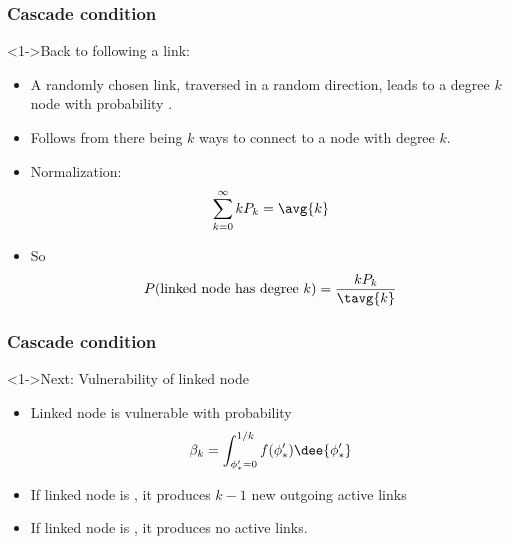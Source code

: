  \begin{frame}
    \frametitle{Cascade condition}

    \begin{block}<1->{Back to following a link:}
      \begin{itemize}
      \item<2-> A randomly chosen link, traversed in a random direction,
         leads to a degree $k$ node with probability .
      \item<3-> Follows from there being $k$ ways
        to connect to a node with degree $k$.
      \item<4-> Normalization:
        $$\sum_{k=0}^\infty {kP_k} = \avg{k}$$
      \item<5-> So
        $$ 
        P(\mbox{linked node has degree $k$})
        =
        \frac{kP_k}{\tavg{k}}
        $$
      \end{itemize}
    \end{block}

  \end{frame}

 \begin{frame}
    \frametitle{Cascade condition}

    \begin{block}<1->{Next: Vulnerability of linked node}
      \begin{itemize}
      \item<2-> 
        Linked node is \alert{vulnerable}
        with probability 
        $$\beta_k = \int_{\phi_\ast'=0}^{1/k} f(\phi_\ast') \dee{\phi_\ast'}$$
      \item<3-> If linked node is , it produces 
        \alert{$k-1$ new}
        outgoing active links
      \item<4-> If linked node is , it produces \alert{no} active links.
      \end{itemize}
    \end{block}

  \end{frame}

